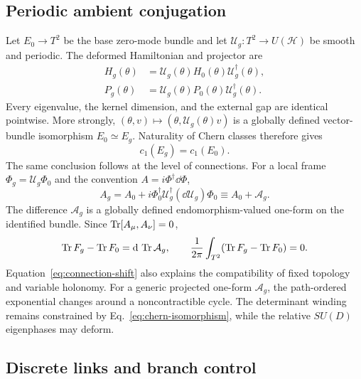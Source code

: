\subsection{Periodic ambient conjugation}

Let \(E_0\to T^2\) be the base zero-mode bundle and let \(\mathcal U_g:T^2\to U(\mathcal H)\) be smooth and periodic. The deformed Hamiltonian and projector are
\begin{equation}
 \begin{aligned}
 H_g(\theta)
 &=\mathcal U_g(\theta)H_0(\theta)\mathcal U_g^\dagger(\theta),\\
 P_g(\theta)
 &=\mathcal U_g(\theta)P_0(\theta)\mathcal U_g^\dagger(\theta).
 \end{aligned}
 \label{eq:periodic-ambient-conjugation}
\end{equation}
Every eigenvalue, the kernel dimension, and the external gap are identical pointwise. More strongly, \((\theta,v)\mapsto(\theta,\mathcal U_g(\theta)v)\) is a globally defined vector-bundle isomorphism \(E_0\simeq E_g\). Naturality of Chern classes therefore gives
\begin{equation}
 c_1(E_g)=c_1(E_0).
 \label{eq:chern-isomorphism}
\end{equation}
The same conclusion follows at the level of connections. For a local frame \(\Phi_g=\mathcal U_g\Phi_0\) and the convention \(A=i\Phi^\dagger\dd\Phi\),
\begin{equation}
 A_g=A_0+i\Phi_0^\dagger\mathcal U_g^\dagger
 (\dd\mathcal U_g)\Phi_0
 \equiv A_0+\mathcal A_g.
 \label{eq:connection-shift}
\end{equation}
The difference \(\mathcal A_g\) is a globally defined endomorphism-valued one-form on the identified bundle. Since \(\operatorname{Tr}[A_\mu,A_\nu]=0\),
\begin{equation}
 \operatorname{Tr} F_g-\operatorname{Tr} F_0=\mathrm{d}\,\operatorname{Tr}\mathcal A_g,\qquad
 \frac{1}{2\pi}\int_{T^2}(\operatorname{Tr} F_g-\operatorname{Tr} F_0)=0.
 \label{eq:chern-exact-difference}
\end{equation}
Equation~\eqref{eq:connection-shift} also explains the compatibility of fixed topology and variable holonomy. For a generic projected one-form \(\mathcal A_g\), the path-ordered exponential changes around a noncontractible cycle. The determinant winding remains constrained by Eq.~\eqref{eq:chern-isomorphism}, while the relative \(SU(D)\) eigenphases may deform.

\subsection{Discrete links and branch control}

